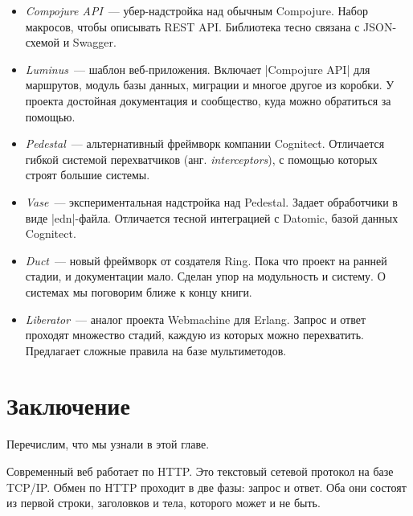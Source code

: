 \begin{itemize}

\item
  \emph{Compojure API}~---
  убер-надстройка над обычным Compojure. Набор макросов, чтобы описывать REST
  API. Библиотека тесно связана с JSON-схемой и Swagger.

\item
  \emph{Luminus}~--- шаблон
  веб-приложения. Включает \spverb|Compojure API| для маршрутов, модуль базы
  данных, миграции и многое другое из коробки. У проекта достойная документация
  и сообщество, куда можно обратиться за помощью.

\item
  \emph{Pedestal}~---
  альтернативный фреймворк компании Cognitect. Отличается гибкой системой
  перехватчиков (анг. \emph{interceptors}), с помощью которых строят большие
  системы.

\item
  \emph{Vase}~---
  экспериментальная надстройка над Pedestal. Задает обработчики в виде
  \spverb|edn|-файла. Отличается тесной интеграцией с Datomic, базой данных
  Cognitect.

\item
  \emph{Duct}~--- новый
  фреймворк от создателя Ring. Пока что проект на ранней стадии, и документации
  мало. Сделан упор на модульность и систему. О системах мы поговорим ближе к
  концу книги.

\item
  \emph{Liberator}~---
  аналог проекта Webmachine для Erlang. Запрос и ответ проходят множество
  стадий, каждую из которых можно перехватить. Предлагает сложные правила на
  базе мультиметодов.

\end{itemize}

\section{Заключение}

Перечислим, что мы узнали в этой главе.

Современный веб работает по HTTP. Это текстовый сетевой протокол на базе
TCP/IP. Обмен по HTTP проходит в две фазы: запрос и ответ. Оба они состоят из
первой строки, заголовков и тела, которого может и не быть.

